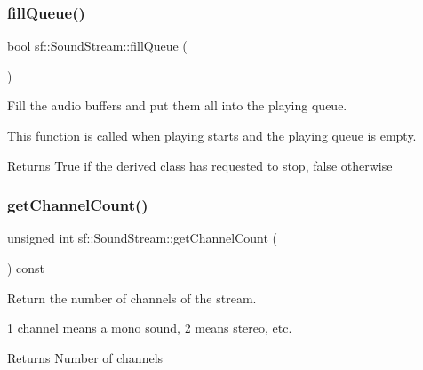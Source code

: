 \subsubsection{\texorpdfstring{fillQueue()}{fillQueue()}}
{\footnotesize\ttfamily bool sf\+::\+Sound\+Stream\+::fill\+Queue (\begin{DoxyParamCaption}{ }\end{DoxyParamCaption})\hspace{0.3cm}{\ttfamily [private]}}



Fill the audio buffers and put them all into the playing queue. 

This function is called when playing starts and the playing queue is empty.

\begin{DoxyReturn}{Returns}
True if the derived class has requested to stop, false otherwise \begin{DoxyVerb}\end{DoxyVerb}
 
\end{DoxyReturn}
\mbox{\label{classsf_1_1_sound_stream_a1f70933912dd9498f4dc99feefed27f3}} 
\subsubsection{\texorpdfstring{getChannelCount()}{getChannelCount()}}
{\footnotesize\ttfamily unsigned int sf\+::\+Sound\+Stream\+::get\+Channel\+Count (\begin{DoxyParamCaption}{ }\end{DoxyParamCaption}) const}



Return the number of channels of the stream. 

1 channel means a mono sound, 2 means stereo, etc.

\begin{DoxyReturn}{Returns}
Number of channels \begin{DoxyVerb}\end{DoxyVerb}
 
\end{DoxyReturn}
\mbox{\label{classsf_1_1_sound_stream_a49d263f9bbaefec4b019bd05fda59b25}} 
